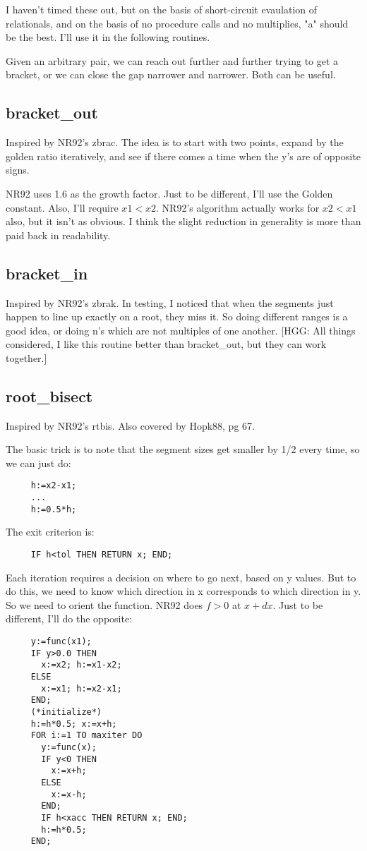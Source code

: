 I haven't timed these out, but on the basis of short-circuit
evaulation of relationals, and on the basis of no procedure
calls and no multiplies, "a" should be the best.  I'll use
it in the following routines.

Given an arbitrary pair, we can reach out further and
further trying to get a bracket, or we can close the gap
narrower and narrower.  Both can be useful.

\subsection*{bracket\_out}
Inspired by NR92's zbrac.  The idea is to start with two
points, expand by the golden ratio iteratively, and see if
there comes a time when the y's are of opposite signs.

NR92 uses 1.6 as the growth factor.  Just to be different,
I'll use the Golden constant.  Also,
I'll require $x1<x2$.  NR92's algorithm actually works for
$x2<x1$ also, but it isn't as obvious.  I think the slight
reduction in generality is more than paid back in
readability.

\subsection*{bracket\_in}
Inspired by NR92's zbrak.  In testing, I noticed that when
the segments just happen to line up exactly on a root, they
miss it.  So doing different ranges is a good idea,
or doing n's which are not multiples of one another.  [HGG: All
things considered, I like this routine better than
bracket\_out, but they can work together.]

\subsection*{root\_bisect}
Inspired by NR92's rtbis.  Also covered by Hopk88, pg 67.

The basic trick is to note that the segment sizes get
smaller by 1/2 every time, so we can just do:
\begin{verbatim}
     h:=x2-x1;
     ...
     h:=0.5*h;
\end{verbatim}

The exit criterion is:
\begin{verbatim}
     IF h<tol THEN RETURN x; END;
\end{verbatim}

Each iteration requires a decision on where to go next,
based on y values.  But to do this, we need to know which
direction in x corresponds to which direction in y.  So we
need to orient the function.  NR92 does $f>0$ at $x+dx$.  Just
to be different, I'll do the opposite:
\begin{verbatim}
     y:=func(x1);
     IF y>0.0 THEN
       x:=x2; h:=x1-x2;
     ELSE
       x:=x1; h:=x2-x1;
     END;
     (*initialize*)
     h:=h*0.5; x:=x+h;
     FOR i:=1 TO maxiter DO
       y:=func(x);
       IF y<0 THEN
         x:=x+h;
       ELSE
         x:=x-h;
       END;
       IF h<xacc THEN RETURN x; END;
       h:=h*0.5;
     END;
\end{verbatim}
     
